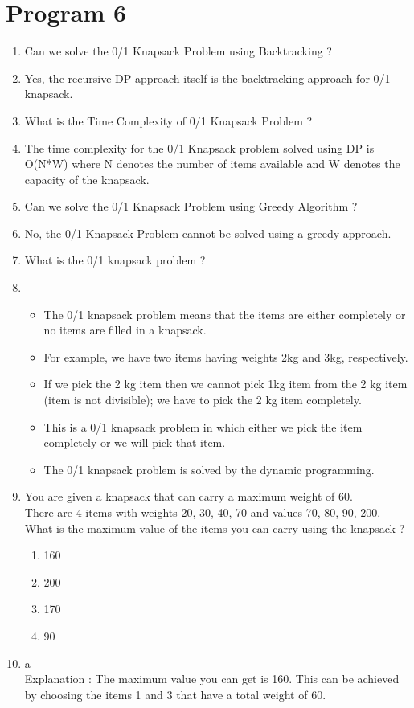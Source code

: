 ﻿\documentclass{article}
\newcommand{\answer}{\item [$\rightarrow$]}
\begin{document}
	\section*{Program 6}  
	\begin{enumerate}
		\item Can we solve the 0/1 Knapsack Problem using Backtracking ?
		\answer Yes, the recursive DP approach itself is the backtracking approach for 0/1 knapsack.
		
		\item What is the Time Complexity of 0/1 Knapsack Problem ?
		\answer The time complexity for the 0/1 Knapsack problem solved using DP is O(N*W) where N denotes the number of items available and W denotes the capacity of the knapsack.
		
		\item Can we solve the 0/1 Knapsack Problem using Greedy Algorithm ?
		\answer No, the 0/1 Knapsack Problem cannot be solved using a greedy approach.
		
		\item What is the 0/1 knapsack problem ?
		\answer \begin{itemize}
			\item The 0/1 knapsack problem means that the items are either completely or no items are filled in a knapsack.
			\item For example, we have two items having weights 2kg and 3kg, respectively.
			\item If we pick the 2 kg item then we cannot pick 1kg item from the 2 kg item (item is not divisible); we have to pick the 2 kg item completely.
			\item This is a 0/1 knapsack problem in which either we pick the item completely or we will pick that item.
			\item The 0/1 knapsack problem is solved by the dynamic programming.
		\end{itemize}
		
		\item You are given a knapsack that can carry a maximum weight of 60. \\
		There are 4 items with weights {20, 30, 40, 70} and values {70, 80, 90, 200}. \\
		What is the maximum value of the items you can carry using the knapsack ?
		\begin{enumerate}[label=\alph*) ]
			\item 160
			\item 200
			\item 170
			\item 90
		\end{enumerate}
		\answer a \\
		Explanation : The maximum value you can get is 160. This can be achieved by choosing the items 1 and 3 that have a total weight of 60.
		

\end{enumerate}
\end{document}
